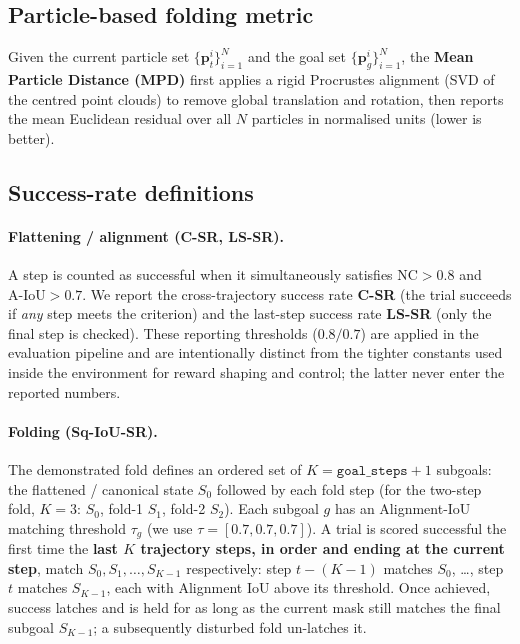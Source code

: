 \documentclass[journal]{IEEEtran}
\begin{document}
\subsection{Particle-based folding metric}
Given the current particle set $\{\mathbf{p}_t^i\}_{i=1}^{N}$ and the goal set
$\{\mathbf{p}_g^i\}_{i=1}^{N}$, the \textbf{Mean Particle Distance (MPD)} first applies a rigid
Procrustes alignment (SVD of the centred point clouds) to remove global translation and rotation, then
reports the mean Euclidean residual over all $N$ particles in normalised units (lower is better).

\subsection{Success-rate definitions}
\paragraph{Flattening / alignment (C-SR, LS-SR).} A step is counted as successful when it
simultaneously satisfies $\mathrm{NC} > 0.8$ and $\text{A-IoU} > 0.7$. We report the
cross-trajectory success rate \textbf{C-SR} (the trial succeeds if \emph{any} step meets the
criterion) and the last-step success rate \textbf{LS-SR} (only the final step is checked). These
reporting thresholds ($0.8/0.7$) are applied in the evaluation pipeline and are intentionally distinct
from the tighter constants used inside the environment for reward shaping and control; the latter never
enter the reported numbers.

\paragraph{Folding (Sq-IoU-SR).}
\label{app:sq_iou_sr}
The demonstrated fold defines an ordered set of $K = \texttt{goal\_steps}+1$ subgoals: the flattened /
canonical state $S_0$ followed by each fold step (for the two-step fold, $K=3$: $S_0$, fold-1 $S_1$,
fold-2 $S_2$). Each subgoal $g$ has an Alignment-IoU matching threshold $\tau_g$ (we use
$\tau=[0.7,0.7,0.7]$). A trial is scored successful the first time the \textbf{last $K$ trajectory
steps, in order and ending at the current step}, match $S_0, S_1, \dots, S_{K-1}$ respectively: step
$t{-}(K{-}1)$ matches $S_0$, \dots, step $t$ matches $S_{K-1}$, each with Alignment IoU above its
threshold. Once achieved, success
latches and is held for as long as the current mask still matches the final subgoal $S_{K-1}$; a
subsequently disturbed fold un-latches it.
\end{document}
